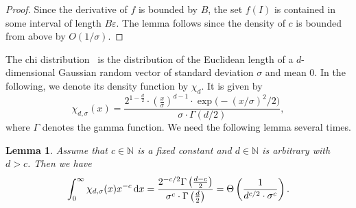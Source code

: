 \documentclass[11pt,DIV=12,a4paper]{scrartcl}
\newtheorem{lemma}[claim]{Lemma}
\newcommand{\nat}{\ensuremath{\mathbb{N}}}
\newcommand{\eps}{\varepsilon}
\begin{document}
\begin{proof}
Since the derivative of $f$ is bounded by $B$, the set $f(I)$ is contained
in some interval of length $B\eps$. The lemma follows
since the density of $c$ is bounded from above by $O(1/\sigma)$.
\end{proof}



The chi distribution~\cite[Section 8]{EvansEA:StatisticalDist:2000} is the distribution of the Euclidean length of a $d$-dimensional Gaussian 
random vector of standard deviation $\sigma$ and mean $0$. In the following,
we denote its density function by $\chi_d$. It is given
by
\begin{equation}
\chi_{d,\sigma}(x) = \frac{2^{1-\frac d2} \cdot \left(\frac x\sigma\right)^{d-1} \cdot \exp\bigl(-(x/\sigma)^2/2\bigr)}{\sigma \cdot \Gamma(d/2)}, \label{equ:chi}
\end{equation}
where $\Gamma$ denotes the gamma function.
We need the following lemma several times.


\begin{lemma}
\label{lem:integral}
Assume that $c \in \nat$ is a fixed constant and $d \in \nat$ is arbitrary with $d > c$. Then we have
\[
\int_0^\infty  \chi_{d,\sigma}(x) x^{-c} \, \textup dx = 
\frac{2^{-c/2} \Gamma\left(\frac{d-c}2\right)}{\sigma^c \cdot \Gamma\left(\frac d2 \right)} = 
 \Theta\left(\frac{1}{d^{c/2} \cdot \sigma^c}\right).
\]
\end{lemma}
\end{document}
